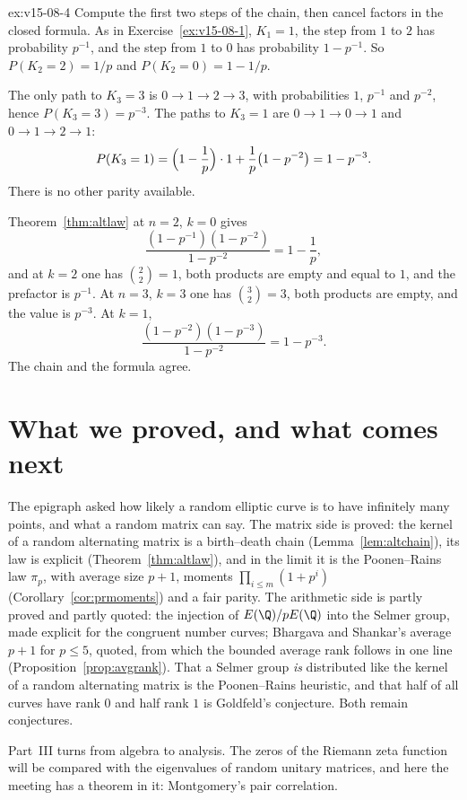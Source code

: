 \begin{solution}{ex:v15-08-4}
\idea Compute the first two steps of the chain, then cancel factors in the closed formula.
\writeup As in Exercise~\ref{ex:v15-08-1}, \(K_1=1\), the step from \(1\) to \(2\) has probability \(p^{-1}\), and the step from \(1\) to \(0\) has probability \(1-p^{-1}\). So \(P(K_2=2)=1/p\) and \(P(K_2=0)=1-1/p\).

The only path to \(K_3=3\) is \(0\to1\to2\to3\), with probabilities \(1\), \(p^{-1}\) and \(p^{-2}\), hence \(P(K_3=3)=p^{-3}\). The paths to \(K_3=1\) are \(0\to1\to0\to1\) and \(0\to1\to2\to1\):
\[
P(K_3=1)=\Bigl(1-\frac1p\Bigr)\cdot1+\frac1p\bigl(1-p^{-2}\bigr)=1-p^{-3}.
\]
There is no other parity available.

Theorem~\ref{thm:altlaw} at \(n=2\), \(k=0\) gives
\[
\frac{(1-p^{-1})(1-p^{-2})}{1-p^{-2}}=1-\frac1p,
\]
and at \(k=2\) one has \(\binom{2}{2}=1\), both products are empty and equal to \(1\), and the prefactor is \(p^{-1}\). At \(n=3\), \(k=3\) one has \(\binom{3}{2}=3\), both products are empty, and the value is \(p^{-3}\). At \(k=1\),
\[
\frac{(1-p^{-2})(1-p^{-3})}{1-p^{-2}}=1-p^{-3}.
\]
The chain and the formula agree.
\end{solution}

\section{What we proved, and what comes next}

The epigraph asked how likely a random elliptic curve is to have infinitely many points, and what a random matrix can say. The matrix side is proved: the kernel of a random alternating matrix is a birth--death chain (Lemma~\ref{lem:altchain}), its law is explicit (Theorem~\ref{thm:altlaw}), and in the limit it is the Poonen--Rains law $\pi_p$, with average size $p+1$, moments $\prod_{i\le m}(1+p^i)$ (Corollary~\ref{cor:prmoments}) and a fair parity. The arithmetic side is partly proved and partly quoted: the injection of $E(\Q)/pE(\Q)$ into the Selmer group, made explicit for the congruent number curves; Bhargava and Shankar's average $p+1$ for $p\le5$, quoted, from which the bounded average rank follows in one line (Proposition~\ref{prop:avgrank}). That a Selmer group \emph{is} distributed like the kernel of a random alternating matrix is the Poonen--Rains heuristic, and that half of all curves have rank $0$ and half rank $1$ is Goldfeld's conjecture. Both remain conjectures.

Part~III turns from algebra to analysis. The zeros of the Riemann zeta function will be compared with the eigenvalues of random unitary matrices, and here the meeting has a theorem in it: Montgomery's pair correlation.

